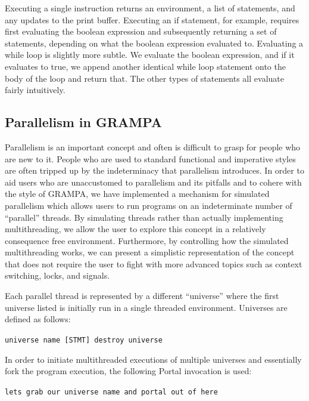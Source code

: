\documentclass[numbers]{sigplanconf}
\begin{document}
Executing a single instruction returns an environment, a list of statements, and any updates to the print buffer. Executing an if statement, for example, requires first evaluating the boolean expression and subsequently returning a set of statements, depending on what the boolean expression evaluated to. Evaluating a while loop is slightly more subtle. We evaluate the boolean expression, and if it evaluates to true, we append another identical while loop statement onto the body of the loop and return that. The other types of statements all evaluate fairly intuitively.

\subsection{Parallelism in GRAMPA}
Parallelism is an important concept and often is difficult to grasp for people who are new to it. People who are used to standard functional and imperative styles are often tripped up by the indeterminacy that parallelism introduces. In order to aid users who are unaccustomed to parallelism and its pitfalls and to cohere with the style of GRAMPA, we have implemented a mechanism for simulated parallelism which allows users to run programs on an indeterminate number of “parallel” threads. By simulating threads rather than actually implementing multithreading, we allow the user to explore this concept in a relatively consequence free environment. Furthermore, by controlling how the simulated multithreading works, we can present a simplistic representation of the concept that does not require the user to fight with more advanced topics such as context switching, locks, and signals.
	
Each parallel thread is represented by a different “universe” where the first universe listed is initially run in a single threaded environment. Universes are defined as follows:


\texttt{universe name [STMT] destroy universe}

	
In order to initiate multithreaded executions of multiple universes and essentially fork the program execution, the following Portal invocation is used:
	

\texttt{lets grab our universe name and portal out of here}
\end{document}
